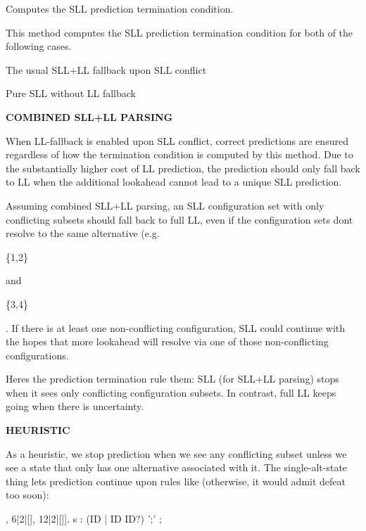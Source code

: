 Computes the S\+LL prediction termination condition.

This method computes the S\+LL prediction termination condition for both of the following cases.


\begin{DoxyItemize}
\item The usual S\+L\+L+\+LL fallback upon S\+LL conflict 
\item Pure S\+LL without LL fallback 
\end{DoxyItemize}

{\bfseries C\+O\+M\+B\+I\+N\+ED S\+L\+L+\+LL P\+A\+R\+S\+I\+NG}

When L\+L-\/fallback is enabled upon S\+LL conflict, correct predictions are ensured regardless of how the termination condition is computed by this method. Due to the substantially higher cost of LL prediction, the prediction should only fall back to LL when the additional lookahead cannot lead to a unique S\+LL prediction.

Assuming combined S\+L\+L+\+LL parsing, an S\+LL configuration set with only conflicting subsets should fall back to full LL, even if the configuration sets don\textquotesingle{}t resolve to the same alternative (e.\+g. 
\begin{DoxyCode}
\{1,2\} 
\end{DoxyCode}
 and
\begin{DoxyCode}
\{3,4\} 
\end{DoxyCode}
 . If there is at least one non-\/conflicting configuration, S\+LL could continue with the hopes that more lookahead will resolve via one of those non-\/conflicting configurations.

Here\textquotesingle{}s the prediction termination rule them\+: S\+LL (for S\+L\+L+\+LL parsing) stops when it sees only conflicting configuration subsets. In contrast, full LL keeps going when there is uncertainty.

{\bfseries H\+E\+U\+R\+I\+S\+T\+IC}

As a heuristic, we stop prediction when we see any conflicting subset unless we see a state that only has one alternative associated with it. The single-\/alt-\/state thing lets prediction continue upon rules like (otherwise, it would admit defeat too soon)\+:


\begin{DoxyCode}
[12|1|[], 6|2|[], 12|2|[]]. s : (ID | ID ID?) \textcolor{charliteral}{';'} ; 
\end{DoxyCode}
 

